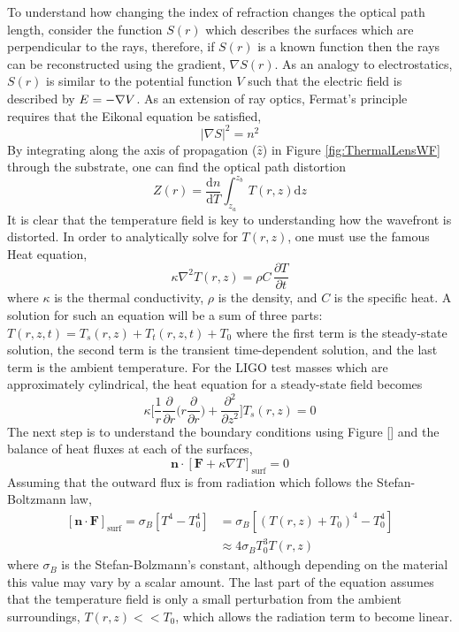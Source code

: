	To understand how changing the index of refraction changes the optical path length, consider the function $S(r)$ which describes the surfaces which are perpendicular to the rays, therefore, if $S(r)$ is a known function then the rays can be reconstructed using the gradient, $\nabla S(r)$.  As an analogy to electrostatics, $S(r)$ is similar to the potential function $V$ such that the electric field is described by $\boldmath{E}=-\nabla V$.  As an extension of ray optics, Fermat's principle requires that the Eikonal equation be satisfied,
	\begin{equation}
	\vert \nabla S \vert^2 = n^2
	\end{equation}
	By integrating along the axis of propagation ($\hat{z}$) in Figure \ref{fig:ThermalLensWF} through the substrate, one can find the optical path distortion
	\begin{equation}\label{eq:thermoref}
	Z(r) =  \frac{\text{d}n}{\text{d}T} \int_{z_a}^{z_b} \, T(r,z) \text{d}z
	\end{equation}
	It is clear that the temperature field is key to understanding how the wavefront is distorted. In order to analytically solve for $T(r,z)$, one must use the famous Heat equation,
	\begin{equation}\label{eq:heat_eq}
		\kappa \nabla^2 T(r,z) = \rho C\, \frac{\partial T}{\partial t} 
	\end{equation}
	where $\kappa$ is the thermal conductivity, $\rho$ is the density, and $C$ is the specific heat.  A solution for such an equation will be a sum of three parts: $T(r,z,t) = T_{s}(r,z) + T_{t}(r,z,t) + T_0$ where the first term is the steady-state solution, the second term is the transient time-dependent solution, and the last term is the ambient temperature.  For the LIGO test masses which are approximately cylindrical, the heat equation for a steady-state field becomes
	\begin{equation}
		\kappa \bigg[ \frac{1}{r} \frac{\partial}{\partial r} \bigg( r \frac{\partial}{\partial r}\bigg) +  \frac{\partial^2}{\partial z^2} \bigg] T_{s}(r,z) = 0
	\end{equation}
	The next step is to understand the boundary conditions using Figure [] and the balance of heat fluxes at each of the surfaces,
	\begin{equation}
	\textbf{n} \cdot [ \textbf{F} + \kappa \nabla T]_{\text{surf}} = 0 
	\end{equation}
	Assuming that the outward flux is from radiation which follows the Stefan-Boltzmann law,
	\begin{equation}\label{eq:heat_flux}
	\begin{aligned}
	[\textbf{n} \cdot  \textbf{F}]_{\text{surf}} = \sigma_B  [T^4 - T_0^4] 	&= \sigma_B [(T(r,z) + T_0)^4 - T_0^4] \\
																			&\approx 4 \sigma_B T_0^3 T(r,z)
	\end{aligned}
	\end{equation}
	where $\sigma_B$ is the Stefan-Bolzmann's constant, although depending on the material this value may vary by a scalar amount.  The last part of the equation assumes that the temperature field is only a small perturbation from the ambient surroundings, $T(r,z) << T_0$, which allows the radiation term to become linear.
	
